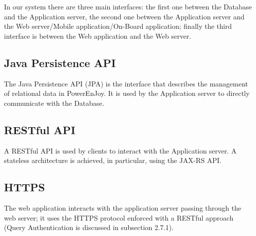 In our system there are three main interfaces: the first one between the Database and the Application server, the second one between the Application server and the Web server/Mobile application/On-Board application; finally the third interface is between the Web application and the Web server.

\subsection{Java Persistence API}
The Java Persistence API (JPA) is the interface that describes the management of relational data in PowerEnJoy. It is used by the Application server to directly communicate with the Database.
 	
\subsection{RESTful API}
A RESTful API is used by clients to interact with the Application server. A stateless architecture is achieved, in particular, using the JAX-RS API.

\subsection{HTTPS}
The web application interacts with the application server passing through the web server; it uses the HTTPS protocol enforced with a RESTful approach (Query Authentication is discussed in subsection 2.7.1). 

